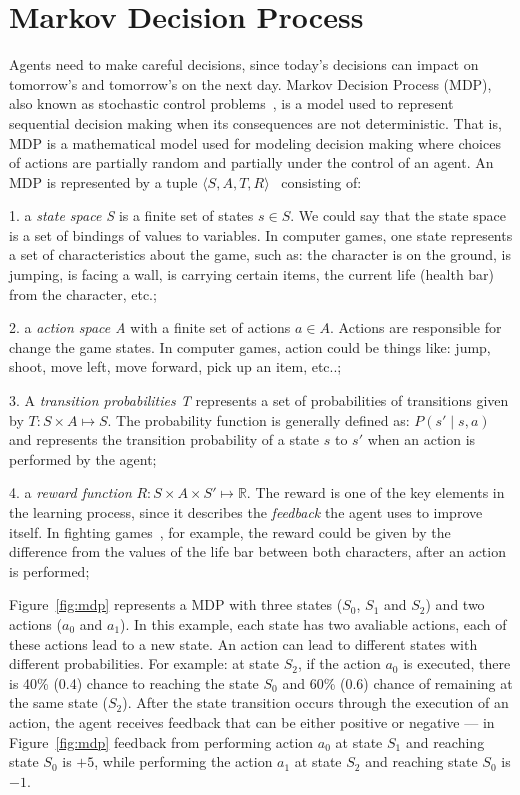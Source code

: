 \section{Markov Decision Process}
\label{sec:markov}

Agents need to make careful decisions, since today's decisions can impact on tomorrow's and tomorrow's on the next day.
Markov Decision Process (MDP), also known as stochastic control problems~\cite{puterman1994markov}, is a model used to represent sequential decision making when its consequences are not deterministic.
That is, MDP is a mathematical model used for modeling decision making where choices of actions are partially random and partially under the control of an agent.
An MDP is represented by a tuple $\langle S, A, T, R\rangle$~\cite{graepel2004learningfight, taylor2011teachingmario} consisting of:

1. a \textit{state space S} is a finite set of states $s \in S$.
We could say that the state space is a set of bindings of values to variables.
In computer games, one state represents a set of characteristics about the game, such as:
the character is on the ground, is jumping, is facing a wall, is carrying certain items, the current life (health bar) from the character, etc.;

2. a \textit{action space A} with a finite set of actions $a \in A$.
Actions are responsible for change the game states. In computer games, action could be things like:
jump, shoot, move left, move forward, pick up an item, etc..;

3. A \textit{transition probabilities T} represents a set of probabilities of transitions given by
$T : S \times A \mapsto S$. The probability function is generally defined as:
$P(s' \mid s,a)$ and represents the transition probability of a state $s$ to $s'$ when
an action is performed by the agent;

4. a \textit{reward function} $R : S \times A \times S' \mapsto \mathbb{R}$.
The reward is one of the key elements in the learning process, since it describes
the \textit{feedback} the agent uses to improve itself.
In fighting games~\cite{graepel2004learningfight}, for example, the reward could be given
by the difference from the values of the life bar between both characters, after an action is performed;

Figure~\ref{fig:mdp} represents a MDP with three states ($S_0$, $S_1$ and $S_2$) and
two actions ($a_0$ and $a_1$). In this example, each state has two avaliable actions,
each of these actions lead to a new state. An action can lead to different states with different probabilities.
For example: at state $S_2$, if the action $a_0$ is executed, there is 40\% (0.4) chance to
reaching the state $S_0$ and 60\% (0.6) chance of remaining at the same state ($S_2$).
After the state transition occurs through the execution of an action, the agent receives feedback that can be
either positive or negative --- in Figure~\ref{fig:mdp} feedback from performing action $a_0$ at state $S_1$
and reaching state $S_0$ is $+5$, while performing the action $a_1$ at state $S_2$ and reaching state $S_0$
is $-1$.

